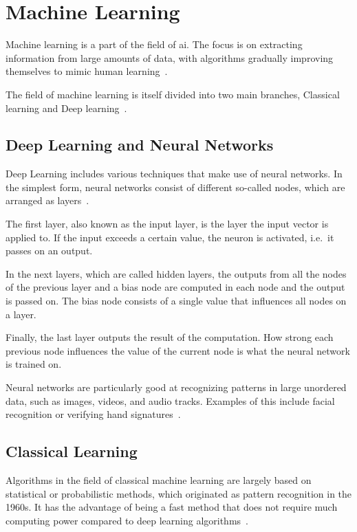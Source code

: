 \section{Machine Learning}\label{sec:machine_learning}
Machine learning is a part of the field of \ac{ai}. The focus is on extracting information from large amounts of data, with algorithms gradually improving themselves to mimic human learning~\cite{what-is-ml}.

The field of machine learning is itself divided into two main branches, Classical learning and Deep learning~\cite{ml-visual-explanation}.


\subsection{Deep Learning and Neural Networks}

Deep Learning includes various techniques that make use of neural networks. In the simplest form, neural networks consist of different so-called nodes, which are arranged as layers~\cite{neuralNet}.

The first layer, also known as the input layer, is the layer the input vector is applied to. If the input exceeds a certain value, the neuron is activated, i.e.\ it passes on an output.

In the next layers, which are called hidden layers, the outputs from all the nodes of the previous layer and a bias node are computed in each node and the output is passed on. The bias node consists of a single value that influences all nodes on a layer.

Finally, the last layer outputs the result of the computation. How strong each previous node influences the value of the current node is what the neural network is trained on.

Neural networks are particularly good at recognizing patterns in large unordered data, such as images, videos, and audio tracks. Examples of this include facial recognition or verifying hand signatures~\cite{neuralNet-applications}.



\subsection{Classical Learning} %
Algorithms in the field of classical machine learning are largely based on statistical or probabilistic methods, which originated as pattern recognition in the 1960s. It has the advantage of being a fast method that does not require much computing power compared to deep learning algorithms~\cite{classical-ml}.

